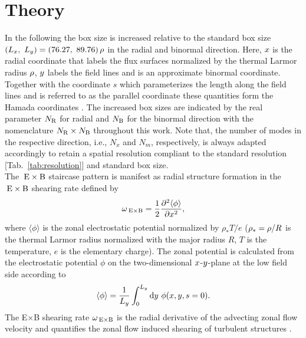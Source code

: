 
\chapter{Theory}
\label{chap:theory}

In the following the box size is increased relative to the standard box size $(L_x,~L_y) = (76.27,~89.76)\,\rho$ in the radial and binormal direction. Here, $x$ is the radial coordinate that labels the flux surfaces normalized by the thermal Larmor radius $\rho$, $y$ labels the field lines and is an approximate binormal coordinate. Together with the coordinate $s$ which parameterizes the length along the field lines and is referred to as the parallel coordinate these quantities form the Hamada coordinates \cite{hamada1958}.
The increased box sizes are indicated by the real parameter $N_\mathrm{R}$ for radial and $N_\mathrm{B}$ for the binormal direction with the nomenclature $N_\mathrm{R}\times N_\mathrm{B}$ throughout this work.
Note that, the number of modes in the respective direction, i.e., $N_x$ and $N_m$, respectively, is always adapted accordingly to retain a spatial resolution compliant to the standard resolution [Tab.~\ref{tab:resolution}] and standard box size. \\
The $\mathrm{\:E}\times\mathrm{B}$ staircase pattern is manifest as radial structure formation in the $\mathrm{\:E}\times\mathrm{B}$ shearing rate defined by\cite{rath2016, doi:10.1063/1.3005380, peeters2016}
\begin{equation}
	\omega_{\mathrm{\:E \times B}} = \frac{1}{2} \frac{\partial^2 \langle \phi \rangle}{\partial x^2},
	\label{eq:shearingrate}
\end{equation}
where $\langle \phi \rangle$ is the zonal electrostatic potential normalized by $\rho_\ast T/e$ ($\rho_\ast = \rho/R$ is the thermal Larmor radius normalized with the major radius $R$, $T$ is the temperature, $e$ is the elementary charge).
The zonal potential is calculated from the electrostatic potential $\phi$ on the two-dimensional $x$-$y$-plane at the low field side according to\cite{rath2021}
\begin{equation}
\langle \phi \rangle = \frac{1}{L_y} \int_0^{L_y} \mathrm{d}y ~ \phi(x,y,s=0).
\end{equation}
The E$\times$B shearing rate $\omega_{\mathrm{\:E \times B}}$ is the radial derivative of the advecting zonal flow velocity \cite{doi:10.1063/1.871313, doi:10.1063/1.872847} and quantifies the zonal flow induced shearing of turbulent structures \cite{doi:10.1063/1.859529, doi:10.1063/1.871313, doi:10.1063/1.872367}. \\
